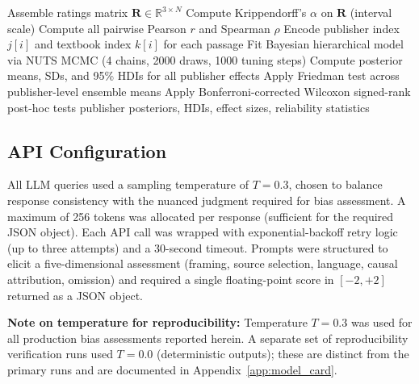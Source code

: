 \documentclass[10pt,letterpaper]{article}
\begin{document}
\begin{algorithm}[h]
\caption{LLM Ensemble Bias Assessment Pipeline}
\label{alg:pipeline}
\BlankLine
{}
\BlankLine
{}
Assemble ratings matrix $\mathbf{R} \in \mathbb{R}^{3 \times N}$\;
Compute Krippendorff's $\alpha$ on $\mathbf{R}$ (interval scale)\;
Compute all pairwise Pearson $r$ and Spearman $\rho$\;
\BlankLine
{}
Encode publisher index $j[i]$ and textbook index $k[i]$ for each passage\;
Fit Bayesian hierarchical model via NUTS MCMC
  (4 chains, 2000 draws, 1000 tuning steps)\;
Compute posterior means, SDs, and 95\% HDIs for all publisher effects\;
\BlankLine
{}
Apply Friedman test across publisher-level ensemble means\;
Apply Bonferroni-corrected Wilcoxon signed-rank post-hoc tests\;
\BlankLine
\Return publisher posteriors, HDIs, effect sizes, reliability statistics
\end{algorithm}

\subsection{API Configuration}
\label{sec:api_config}

All LLM queries used a sampling temperature of $T = 0.3$, chosen to balance
response consistency with the nuanced judgment required for bias assessment.
A maximum of 256 tokens was allocated per response (sufficient for the required
JSON object).  Each API call was wrapped with exponential-backoff retry logic
(up to three attempts) and a 30-second timeout.  Prompts were structured to elicit
a five-dimensional assessment (framing, source selection, language, causal
attribution, omission) and required a single floating-point score in $[-2, +2]$
returned as a JSON object.

\textbf{Note on temperature for reproducibility:}  Temperature $T = 0.3$ was
used for all production bias assessments reported herein.  A separate set of
reproducibility verification runs used $T = 0.0$ (deterministic outputs); these
are distinct from the primary runs and are documented in
Appendix~\ref{app:model_card}.
\end{document}
